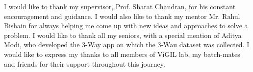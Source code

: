 \acknowledgments

I would like to thank my supervisor, Prof. Sharat Chandran, for his constant encouragement and guidance. I would also like to thank my mentor Mr. Rahul Bishain for always helping me come up with new ideas and approaches to solve a problem. I would like to thank all my seniors, with a special mention of Aditya Modi, who developed the 3-Way app on which the 3-Wau dataset was collected. I would like to express my thanks to all members of ViGIL lab, my batch-mates and friends for their support throughout this journey.

\signature{\today}


